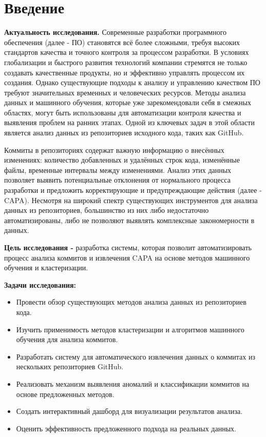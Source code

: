 \chapter*{Введение} %

\textbf{Актуальность исследования.} Современные разработки программного обеспечения (далее - ПО) становятся всё более сложными, требуя высоких стандартов качества и точного контроля за процессом разработки. В условиях глобализации и быстрого развития технологий компании стремятся не только создавать качественные продукты, но и эффективно управлять процессом их создания. Однако существующие подходы к анализу и управлению качеством ПО требуют значительных временных и человеческих ресурсов. Методы анализа данных и машинного обучения, которые уже зарекомендовали себя в смежных областях, могут быть использованы для автоматизации контроля качества и выявления проблем на ранних этапах. Одной из ключевых задач в этой области является анализ данных из репозиториев исходного кода, таких как GitHub.

Коммиты в репозиториях содержат важную информацию о внесённых изменениях: количество добавленных и удалённых строк кода, изменённые файлы, временные интервалы между изменениями. Анализ этих данных позволяет выявить потенциальные отклонения от нормального процесса разработки и предложить корректирующие и предупреждающие действия (далее - CAPA). Несмотря на широкий спектр существующих инструментов для анализа данных из репозиториев, большинство из них либо недостаточно автоматизированы, либо не позволяют выявлять комплексные закономерности в данных.

\textbf{Цель исследования -} разработка системы, которая позволит автоматизировать процесс анализа коммитов и извлечения CAPA на основе методов машинного обучения и кластеризации.

\textbf{Задачи исследования:}
\begin{itemize}
	\item Провести обзор существующих методов анализа данных из репозиториев кода.
	\item Изучить применимость методов кластеризации и алгоритмов машинного обучения для анализа коммитов.
	\item Разработать систему для автоматического извлечения данных о коммитах из нескольких репозиториев GitHub.
	\item Реализовать механизм выявления аномалий и классификации коммитов на основе предложенных методов.
	\item Создать интерактивный дашборд для визуализации результатов анализа.
	\item Оценить эффективность предложенного подхода на реальных данных.
\end{itemize}

